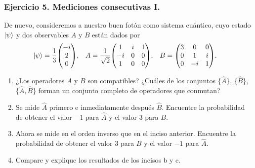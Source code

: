 \documentclass[11pt,letterpaper]{article}
\begin{document}
\subsubsection*{Ejercicio 5. Mediciones consecutivas I.}
De nuevo, consideremos a nuestro buen fotón como sistema cuántico,
cuyo estado $\ket{\psi}$ y dos observables $A$ y $B$ están dados por 
\begin{align}
\ket{\psi}&=\frac{1}{3}\mqty(-i\\2\\0),&
A&=\frac{1}{\sqrt{2}}\mqty(1&i&1\\-i&0&0\\1&0&0),&
B&=\mqty(3&0&0\\0&1&i\\0&-i&1).
\end{align}
\begin{enumerate}
\item ¿Los operadores $A$ y $B$ son compatibles? ¿Cuáles de los conjuntos 
$\{ \hat A\}$, $\{ \hat B\}$,$\{ \hat A,\hat B\}$ forman un conjunto completo 
de operadores que conmutan?
\item Se mide $\hat A$ primero e inmediatamente después $\hat B$. Encuentre
la probabilidad de obtener el valor $-1$ para $\hat A$ y el valor $3$ para $B$.
\item Ahora se mide en el orden inverso que en el inciso anterior. Encuentre
la probabilidad de obtener el valor $3$ para $B$ y el valor $-1$ para $\hat A$.
\item Compare y explique los resultados de los incisos b y c.
\end{enumerate}
\end{document}
